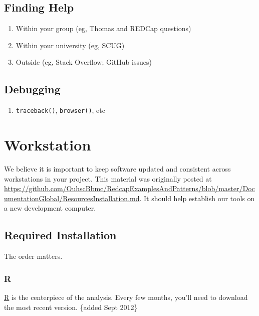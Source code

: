 \documentclass[
]{book}
\providecommand{\tightlist}{%
  \setlength{\itemsep}{0pt}\setlength{\parskip}{0pt}}
\begin{document}
\hypertarget{finding-help}{%
\section{Finding Help}\label{finding-help}}

\begin{enumerate}
\def\labelenumi{\arabic{enumi}.}
\tightlist
\item
  Within your group (eg, Thomas and REDCap questions)
\item
  Within your university (eg, SCUG)
\item
  Outside (eg, Stack Overflow; GitHub issues)
\end{enumerate}

\hypertarget{debugging}{%
\section{Debugging}\label{debugging}}

\begin{enumerate}
\def\labelenumi{\arabic{enumi}.}
\tightlist
\item
  \texttt{traceback()}, \texttt{browser()}, etc
\end{enumerate}

\hypertarget{workstation}{%
\chapter{Workstation}\label{workstation}}

We believe it is important to keep software updated and consistent across workstations in your project. This material was originally posted at \url{https://github.com/OuhscBbmc/RedcapExamplesAndPatterns/blob/master/DocumentationGlobal/ResourcesInstallation.md}. It should help establish our tools on a new development computer.

\hypertarget{installation-required}{%
\section{Required Installation}\label{installation-required}}

The order matters.

\hypertarget{r}{%
\subsection{R}\label{r}}

\href{http://cran.r-project.org/}{R} is the centerpiece of the analysis. Every few months, you'll need to download the most recent version. \{added Sept 2012\}
\end{document}
